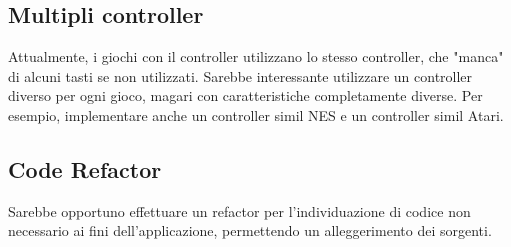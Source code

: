 \subsection{Multipli controller}
Attualmente, i giochi con il controller utilizzano lo stesso controller, che "manca" di alcuni tasti se non utilizzati. Sarebbe interessante utilizzare un controller diverso per ogni gioco, magari con caratteristiche completamente diverse. Per esempio, implementare anche un controller simil NES e un controller simil Atari.
\subsection{Code Refactor}
Sarebbe opportuno effettuare un refactor per l'individuazione di codice non necessario ai fini dell'applicazione, permettendo un alleggerimento dei sorgenti.